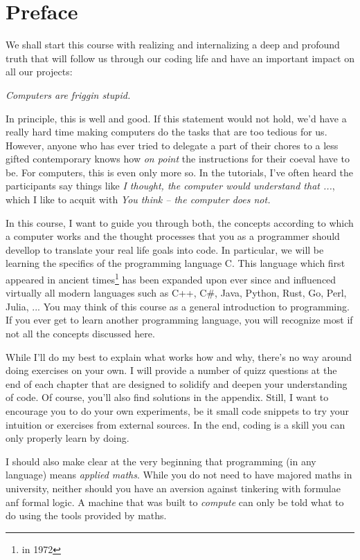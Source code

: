 \chapter*{Preface}
We shall start this course with realizing and internalizing a deep and profound truth that will follow us through our coding life and have an important impact on all our projects:

\begin{center}
\begin{Huge}
	\emph{Computers are friggin stupid.}
\end{Huge}
\end{center}

In principle, this is well and good. If this statement would not hold, we'd have a really hard time making computers do the tasks that are too tedious for us. However, anyone who has ever tried to delegate a part of their chores to a less gifted contemporary knows how \emph{on point} the instructions for their coeval have to be. For computers, this is even only more so. In the tutorials, I've often heard the participants say things like \emph{I thought, the computer would understand that ...}, which I like to acquit with \emph{You think -- the computer does not.}

In this course, I want to guide you through both, the concepts according to which a computer works and the thought processes that you as a programmer should devellop to translate your real life goals into code. In particular, we will be learning the specifics of the programming language C. This language which first appeared in ancient times\footnote{\ie in 1972} has been expanded upon ever since and influenced virtually all modern languages such as C++, C\#, Java, Python, Rust, Go, Perl, Julia, ... You may think of this course as a general introduction to programming. If you ever get to learn another programming language, you will recognize most if not all the concepts discussed here.

While I'll do my best to explain what works how and why, there's no way around doing exercises on your own. I will provide a number of quizz questions at the end of each chapter that are designed to solidify and deepen your understanding of code. Of course, you'll also find solutions in the appendix. Still, I want to encourage you to do your own experiments, be it small code snippets to try your intuition or exercises from external sources. In the end, coding is a skill you can only properly learn by doing.

I should also make clear at the very beginning that programming (in any language) means \emph{applied maths}. While you do not need to have majored maths in university, neither should you have an aversion against tinkering with formulae anf formal logic. A machine that was built to \emph{compute} can only be told what to do using the tools provided by maths.


